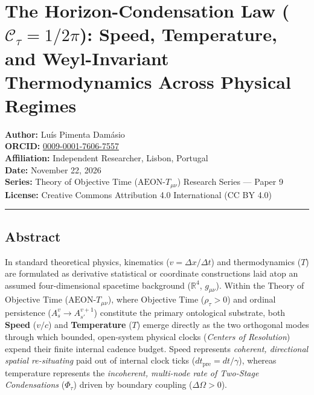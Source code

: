 \documentclass[
]{article}
\author{}
\date{}
\begin{document}
\section{\texorpdfstring{The Horizon-Condensation Law
(\(\mathcal{C}_\tau = 1/2\pi\)): Speed, Temperature, and Weyl-Invariant
Thermodynamics Across Physical
Regimes}{The Horizon-Condensation Law (\textbackslash mathcal\{C\}\_\textbackslash tau = 1/2\textbackslash pi): Speed, Temperature, and Weyl-Invariant Thermodynamics Across Physical Regimes}}\label{the-horizon-condensation-law-mathcalc_tau-12pi-speed-temperature-and-weyl-invariant-thermodynamics-across-physical-regimes}

\textbf{Author:} Luís Pimenta Damásio\\
\textbf{ORCID:}
\href{https://orcid.org/0009-0001-7606-7557}{0009-0001-7606-7557}\\
\textbf{Affiliation:} Independent Researcher, Lisbon, Portugal\\
\textbf{Date:} November 22, 2026\\
\textbf{Series:} Theory of Objective Time (\(\text{AEON-}T_{\mu\nu}\))
Research Series --- Paper 9\\
\textbf{License:} Creative Commons Attribution 4.0 International (CC BY
4.0)

\begin{center}\rule{0.5\linewidth}{0.5pt}\end{center}

\subsection{Abstract}\label{abstract}

In standard theoretical physics, kinematics
(\(v = \Delta x / \Delta t\)) and thermodynamics (\(T\)) are formulated
as derivative statistical or coordinate constructions laid atop an
assumed four-dimensional spacetime background (\(\mathbb{R}^4\),
\(g_{\mu\nu}\)). Within the Theory of Objective Time
(\(\text{AEON-}T_{\mu\nu}\)), where Objective Time (\(\rho_\tau > 0\))
and ordinal persistence (\(A_s^v \to A_{s'}^{v+1}\)) constitute the
primary ontological substrate, both \textbf{Speed} (\(v/c\)) and
\textbf{Temperature} (\(T\)) emerge directly as the two orthogonal modes
through which bounded, open-system physical clocks (\emph{Centers of
Resolution}) expend their finite internal cadence budget. Speed
represents \emph{coherent, directional spatial re-situating} paid out of
internal clock ticks (\(dt_{\mathrm{pre}} = dt/\gamma\)), whereas
temperature represents the \emph{incoherent, multi-node rate of
Two-Stage Condensations} (\(\Phi_\tau\)) driven by boundary coupling
(\(\Delta\Omega > 0\)).
\end{document}
